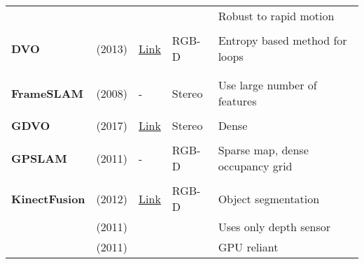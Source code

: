 {\begin{longtable}{l|l|l|l|l}
			&                                   &                                                                    &                       & Robust to rapid motion\\
			&                                   &                                                                    &                       &\\
			\textbf{DVO}           & \cite{Kerl2013} (2013)            & {\href{https://github.com/tum-vision/dvo_slam}{Link}}              & RGB-D                 & Entropy based method for loops\\
			&                                   &                                                                    &                       &\\
			&                                   &                                                                    &                       &\\
			\textbf{FrameSLAM}     & \cite{Konolige2008} (2008)        & -                                                                  & Stereo                & Use large number of features\\
			&                                   &                                                                    &                       &\\
			\textbf{GDVO}          & \cite{Zhu2017} (2017)             & {\href{https://github.com/syywh/gdvo}{Link}}                       & Stereo                & Dense\\
			&                                   &                                                                    &                       &\\
			\textbf{GPSLAM}        & \cite{Pirker2011a} (2011)         & -                                                                  & RGB-D                 & Sparse map, dense occupancy grid\\
			&                                   &                                                                    &                       &\\
			\textbf{KinectFusion}  & \cite{Pirovano2012} (2012)        & {\href{https://github.com/PointCloudLibrary/pcl}{Link}}            & RGB-D                 & Object segmentation\\
			& \cite{Izadi2011} (2011)           &                                                                    &                       & Uses only depth sensor\\
			& \cite{Newcombe2011a} (2011)       &                                                                    &                       & GPU reliant\\

\end{longtable}}
